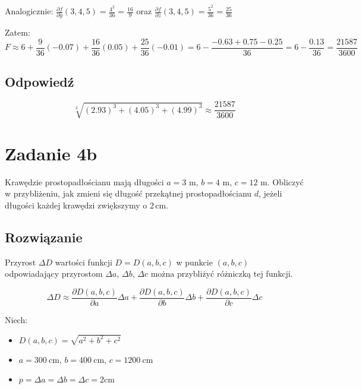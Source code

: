 \documentclass{article}
\newcommand{\partderiv}[2]{\frac{\partial #1}{\partial #2}}
\DeclareMathOperator{\?}{?}
\begin{document}
\vspace{2em}
Analogicznie:
\quad
$\displaystyle \partderiv{f}{y}(3,4,5) = \frac{4^2}{36} = \frac{16}{9} $
\quad oraz \quad
$\displaystyle \partderiv{f}{z}(3,4,5) = \frac{5^2}{36} = \frac{25}{36} $
\vspace{1em}

Zatem:
\begin{equation*}
   F \approx 6 + \frac{9}{36}(-0.07) + \frac{16}{36}(0.05) + \frac{25}{36}(-0.01) =
   6 - \frac{-0.63 + 0.75 - 0.25}{36} = 6 - \frac{0.13}{36} = \frac{21587}{3600}
\end{equation*}

\subsection*{Odpowiedź}
\begin{equation*}
   \sqrt[3]{(2.93)^3 + (4.05)^3 + (4.99)^3} \approx \frac{21587}{3600}
\end{equation*}

\clearpage

\section*{Zadanie 4b}
Krawędzie prostopadłościanu mają długości $a=3$ m, $b=4$ m, $c=12$ m. Obliczyć
w przybliżeniu, jak zmieni się długość przekątnej prostopadłościanu $d$,
jeżeli długości każdej krawędzi zwiększymy o 2\,cm.

\subsection*{Rozwiązanie}

Przyrost $\Delta{D}$ wartości funkcji $D = D(a,b,c)$ w punkcie $(a,b,c)$ odpowiadający
przyrostom $\Delta{a}$, $\Delta{b}$, $\Delta{c}$ można przybliżyć różniczką tej
funkcji.

\begin{equation*}
   \Delta{D} \approx \partderiv{D(a,b,c)}{a}\Delta{a} + \partderiv{D(a,b,c)}{b}\Delta{b} + \partderiv{D(a,b,c)}{c}\Delta{c}
\end{equation*}

Niech:
\begin{itemize}
   \item[] $D(a,b,c) = \sqrt{a^2 + b^2 + c^2}$
   \item[] $a = 300 \mathrm{\ cm}$, $b = 400 \mathrm{\ cm}$, $c = 1200 \mathrm{\ cm}$
   \item[] $p = \Delta{a} = \Delta{b} = \Delta{c} = 2 \mathrm{cm}$
\end{itemize}
\end{document}
